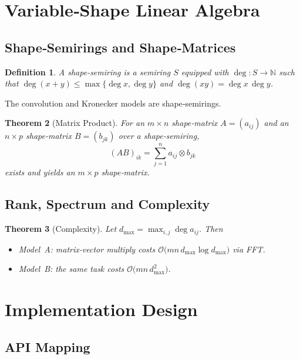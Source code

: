 \documentclass[11pt]{article}
\newtheorem{theorem}{Theorem}[section]
\newtheorem{definition}[theorem]{Definition}
\begin{document}
\section{Variable‑Shape Linear Algebra}
\subsection{Shape‑Semirings and Shape‑Matrices}
\begin{definition}
A \emph{shape‑semiring} is a semiring $S$ equipped with $\deg\colon S\to\mathbb N$ such that $\deg(x+y)\le\max\{\deg x,\deg y\}$ and $\deg(xy)=\deg x\,\deg y$.
\end{definition}

The convolution and Kronecker models are shape‑semirings.

\begin{theorem}[Matrix Product]
For an $m\times n$ shape‑matrix $A=(a_{ij})$ and an $n\times p$ shape‑matrix $B=(b_{jk})$ over a shape‑semiring,
\[(AB)_{ik}=\sum_{j=1}^{n} a_{ij}\otimes b_{jk}\] exists and yields an $m\times p$ shape‑matrix.
\end{theorem}

\subsection{Rank, Spectrum and Complexity}
\begin{theorem}[Complexity]\label{thm:complexity}
Let $d_{\max}=\max_{i,j}\deg a_{ij}$.  Then
\begin{itemize}[leftmargin=1.5em]
  \item Model A: matrix‑vector multiply costs $\mathcal O\bigl(mn\,d_{\max}\log d_{\max}\bigr)$ via FFT.
  \item Model B: the same task costs $\mathcal O\bigl(mn\,d_{\max}^{2}\bigr)$.
\end{itemize}
\end{theorem}

\section{Implementation Design}
\label{sec:implementation}

\subsection{API Mapping}
\label{sec:api}
\end{document}
